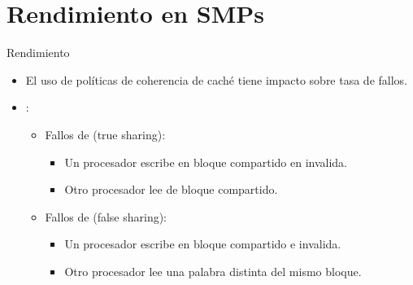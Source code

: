 \section{Rendimiento en SMPs}

\begin{frame}[t]{Rendimiento}
\begin{itemize}
  \item El uso de políticas de coherencia de caché tiene impacto sobre tasa de fallos.

  \item {}:
    \begin{itemize}
      \item Fallos de  (true sharing):
        \begin{itemize}
          \item Un procesador escribe en bloque compartido en invalida.
          \item Otro procesador lee de bloque compartido.
        \end{itemize}
      \item Fallos de  (false sharing):
        \begin{itemize}
          \item Un procesador escribe en bloque compartido e invalida.
          \item Otro procesador lee una palabra distinta del mismo bloque.
        \end{itemize}
    \end{itemize}
\end{itemize}
\end{frame}
